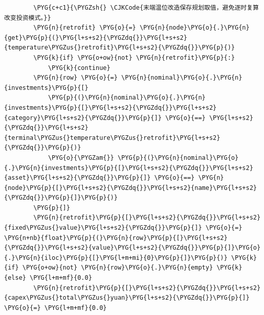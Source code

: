 \begin{Verbatim}
        \PYG{c+c1}{\PYGZsh{} \CJKCode{末端温位改造保存规划取值，避免逐时复算改变投资模式。}}
        \PYG{n}{retrofit} \PYG{o}{=} \PYG{n}{node}\PYG{o}{.}\PYG{n}{get}\PYG{p}{(}\PYG{l+s+s2}{\PYGZdq{}}\PYG{l+s+s2}{temperature\PYGZus{}retrofit}\PYG{l+s+s2}{\PYGZdq{}}\PYG{p}{)}
        \PYG{k}{if} \PYG{o+ow}{not} \PYG{n}{retrofit}\PYG{p}{:}
            \PYG{k}{continue}
        \PYG{n}{row} \PYG{o}{=} \PYG{n}{nominal}\PYG{o}{.}\PYG{n}{investments}\PYG{p}{[}
            \PYG{p}{(}\PYG{n}{nominal}\PYG{o}{.}\PYG{n}{investments}\PYG{p}{[}\PYG{l+s+s2}{\PYGZdq{}}\PYG{l+s+s2}{category}\PYG{l+s+s2}{\PYGZdq{}}\PYG{p}{]} \PYG{o}{==} \PYG{l+s+s2}{\PYGZdq{}}\PYG{l+s+s2}{terminal\PYGZus{}temperature\PYGZus{}retrofit}\PYG{l+s+s2}{\PYGZdq{}}\PYG{p}{)}
            \PYG{o}{\PYGZam{}} \PYG{p}{(}\PYG{n}{nominal}\PYG{o}{.}\PYG{n}{investments}\PYG{p}{[}\PYG{l+s+s2}{\PYGZdq{}}\PYG{l+s+s2}{asset}\PYG{l+s+s2}{\PYGZdq{}}\PYG{p}{]} \PYG{o}{==} \PYG{n}{node}\PYG{p}{[}\PYG{l+s+s2}{\PYGZdq{}}\PYG{l+s+s2}{name}\PYG{l+s+s2}{\PYGZdq{}}\PYG{p}{]}\PYG{p}{)}
        \PYG{p}{]}
        \PYG{n}{retrofit}\PYG{p}{[}\PYG{l+s+s2}{\PYGZdq{}}\PYG{l+s+s2}{fixed\PYGZus{}value}\PYG{l+s+s2}{\PYGZdq{}}\PYG{p}{]} \PYG{o}{=} \PYG{n+nb}{float}\PYG{p}{(}\PYG{n}{row}\PYG{p}{[}\PYG{l+s+s2}{\PYGZdq{}}\PYG{l+s+s2}{value}\PYG{l+s+s2}{\PYGZdq{}}\PYG{p}{]}\PYG{o}{.}\PYG{n}{iloc}\PYG{p}{[}\PYG{l+m+mi}{0}\PYG{p}{]}\PYG{p}{)} \PYG{k}{if} \PYG{o+ow}{not} \PYG{n}{row}\PYG{o}{.}\PYG{n}{empty} \PYG{k}{else} \PYG{l+m+mf}{0.0}
        \PYG{n}{retrofit}\PYG{p}{[}\PYG{l+s+s2}{\PYGZdq{}}\PYG{l+s+s2}{capex\PYGZus{}total\PYGZus{}yuan}\PYG{l+s+s2}{\PYGZdq{}}\PYG{p}{]} \PYG{o}{=} \PYG{l+m+mf}{0.0}


\end{Verbatim}
